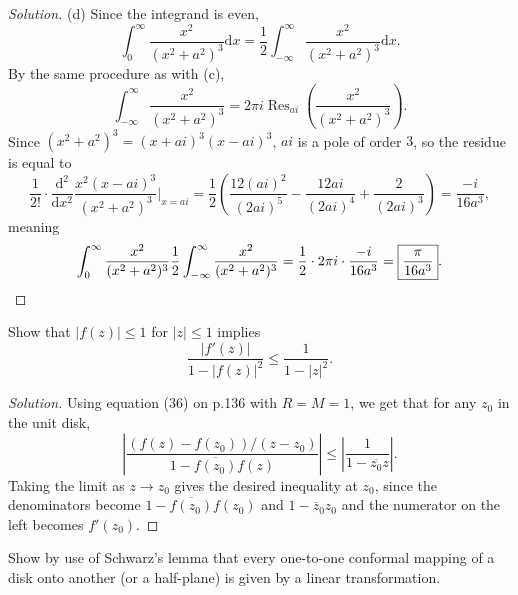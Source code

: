 \documentclass[10pt]{article}
\providecommand{\ol}{\overline}
\newcommand{\dd}{\mathrm{d}}
\providecommand{\half}{\frac{1}{2}}
\newenvironment{soln}{\begin{proof}[Solution]}{\end{proof}}
\providecommand{\abs}[1]{\left\lvert #1\right\rvert}
\begin{document}
\begin{soln}
    (d) Since the integrand is even,
    \begin{equation*}
	\int_0^\infty\frac{x^2}{(x^2 + a^2)^3}\dd x
	= \half \int_{-\infty}^\infty\frac{x^2}{(x^2 + a^2)^3}\dd x.
    \end{equation*}
    By the same procedure as with (c),
    \begin{equation*}
	\int_{-\infty}^\infty \frac{x^2}{(x^2 + a^2)^3}
	= 2\pi i\operatorname{Res}_{ai}\left(\frac{x^2}{(x^2+a^2)^3}\right).
    \end{equation*}
    Since $(x^2 + a^2)^3 = (x+ai)^3(x-ai)^3$,
    $ai$ is a pole of order $3$, so the residue is equal to
    \begin{equation*}
	\frac 1{2!}\cdot\frac{\dd^2}{\dd x^2}\frac{x^2(x-ai)^3}{(x^2+a^2)^3}
	\bigg|_{x=ai}
	= \half\left(\frac{12(ai)^2}{(2ai)^5}
	- \frac{12ai}{(2ai)^4} + \frac 2{(2ai)^3}\right)
	= \frac{-i}{16a^3},
    \end{equation*}
    meaning
    \begin{equation*}
	\int_{0}^\infty \frac{x^2}{(x^2 + a^2)^3}
	\half\int_{-\infty}^\infty \frac{x^2}{(x^2 + a^2)^3}
	= \half\cdot2\pi i\cdot \frac{-i}{16a^3}
	= \boxed{\frac{\pi}{16a^3}}.\qedhere
    \end{equation*}
\end{soln}

\pagebreak
\begin{problem}
    [p.136\#1]
    Show that $\abs{f(z)}\le 1$ for $\abs z\le 1$ implies
    \begin{equation*}
	\frac{\abs{f'(z)}}{1-\abs{f(z)}^2}
	\le \frac{1}{1-\abs{z}^2}.
    \end{equation*}
\end{problem}

\begin{soln}
    Using equation (36) on p.136 with
    $R = M = 1$, we get that for any $z_0$ in the unit disk,
    \begin{equation*}
	\abs{\frac{(f(z) - f(z_0))/(z-z_0)}{1 - \ol{f(z_0)}f(z)}}
	\le \abs{\frac{1}{1-\ol{z_0}z}}.
    \end{equation*}
    Taking the limit as $z\to z_0$ gives the desired inequality
    at $z_0$, since the denominators become
    $1 - \ol{f(z_0)}f(z_0)$ and $1-\ol z_0z_0$
    and the numerator on the left becomes $f'(z_0)$.
\end{soln}

\begin{problem}
    [p.136\#5]
    Show by use of Schwarz's lemma that
    every one-to-one conformal mapping of a disk onto another
    (or a half-plane) is given by a linear transformation.
\end{problem}
\end{document}
